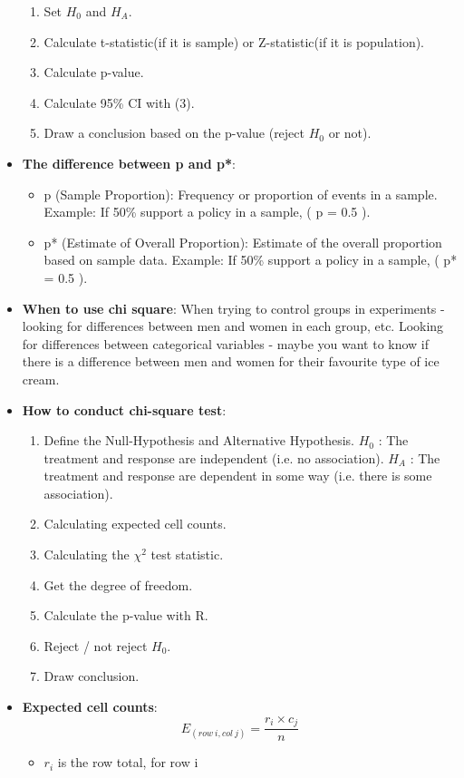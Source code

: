 \documentclass[12pt]{book}
\begin{document}
\begin{itemize}
\begin{enumerate}
\item Set $H_0$ and $H_A$.
\item Calculate t-statistic(if it is sample) or Z-statistic(if it is population).
\item Calculate p-value.
\item Calculate 95\% CI with (3).
\item Draw a conclusion based on the p-value (reject $H_0$ or not).
\end{enumerate}
\item \textbf{The difference between p and p*}:
\begin{itemize}
\item p (Sample Proportion): Frequency or proportion of events in a sample. Example: If 50\% support a policy in a sample, ( p = 0.5 ).
\item p* (Estimate of Overall Proportion): Estimate of the overall proportion based on sample data. Example: If 50\% support a policy in a sample, ( p* = 0.5 ).
\end{itemize}
\item \textbf{When to use chi square}: When trying to control groups in experiments - looking for differences between men and women in each group, etc. Looking for differences between categorical variables - maybe you want to know if there is a difference between men and women for their favourite type of ice cream.
\item \textbf{How to conduct chi-square test}:
\begin{enumerate}
\item Define the Null-Hypothesis and Alternative Hypothesis. $H_0$ : The treatment and response are independent (i.e. no association). $H_A$ : The treatment and response are dependent in some way (i.e. there is some association).
\item Calculating expected cell counts.
\item Calculating the $\chi^2$ test statistic.
\item Get the degree of freedom.
\item Calculate the p-value with R.
\item Reject / not reject $H_0$.
\item Draw conclusion.
\end{enumerate}
\item \textbf{Expected cell counts}: 
$$E_{(row \ i, col \ j)} = \frac{r_i \times c_j}{n}$$
\begin{itemize}
\item $r_i$ is the row total, for row i

\end{itemize}
\end{itemize}
\end{document}
